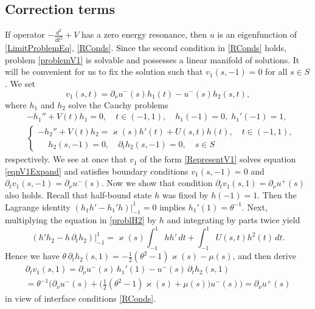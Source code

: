 \documentclass[reqno]{amsart}
\theoremstyle{plain}
\numberwithin{equation}{section}
\renewcommand{\kappa}{\varkappa}
\begin{document}
\subsection{Correction terms}
If operator $-\frac{d^2}{dt^2}+V$ has a zero energy resonance, then $u$ is an eigenfunction of \eqref{LimitProblemEq}, \eqref{RConds}.
 Since the second condition in \eqref{RConds} holds,
problem \eqref{problemV1} is solvable and possesses a li\-near manifold of solutions. It will be convenient for us to fix the solution such that $v_1(s,-1)=0$ for all $s\in S$. We set
\begin{equation}\label{RepresentV1}
  v_1(s,t)=\partial_\nu u^-(s)h_1(t)-u^-(s)h_2(s,t),
\end{equation}
where $h_1$ and $h_2$ solve the Cauchy problems
\begin{align}\nonumber
&-h_1''+V(t)h_1=0,\quad t\in (-1,1),\quad  h_1(-1)=0, \; h_1'(-1)=1,\\
&\begin{cases}
  -h_2''+V(t)h_2=\kappa(s)h'(t)+U(s,t)h(t),\quad t\in (-1,1),\\\label{problH2}
\phantom{-}h_2(s,-1)=0, \quad \partial_th_2(s,-1)=0,\quad s\in S
\end{cases}
\end{align}
respectively.
We see at once that  $v_1$ of the form \eqref{RepresentV1} solves equation \eqref{eqnV1Expand} and satisfies boundary conditions $v_1(s,-1)=0$ and $\partial_t v_1(s, -1)=\partial_\nu u^-(s)$. Now we show that  condition $\partial_t v_1(s, 1)=\partial_\nu u^+(s)$ also holds.
Recall that half-bound state $h$ was fixed by  $h(-1)=1$. Then
the Lagrange identity $(h_1h'-h_1'h)|_{-1}^1=0$ implies  $h_1'(1)=\theta^{-1}$.
Next, multiplying the equation in \eqref{problH2} by $h$ and  integrating by parts twice yield
\begin{equation*}
 (h'h_2-h\,\partial_th_2)\big|_{-1}^1=\kappa(s)\int_{-1}^1hh'\,dt
  +\int_{-1}^1U(s,t)h^2(t)\, dt.
\end{equation*}
Hence we have $\theta \,\partial_th_2(s,1)=-\frac{1}{2}(\theta^2-1)\kappa(s)-\mu(s)$, and then
derive
\begin{multline*}
\partial_t v_1(s,1)=\partial_\nu u^-(s)\,h_1'(1)- u^-(s)\,\partial_th_2(s,1)\\
=\theta^{-1} \Big(\partial_\nu u^-(s)+\big(\textstyle\frac{1}{2 }(\theta^2-1)\kappa(s)+\mu(s)\big)u^-(s)\Big)=\partial_\nu u^+(s)
\end{multline*}
in view of interface conditions \eqref{RConds}.
\end{document}
